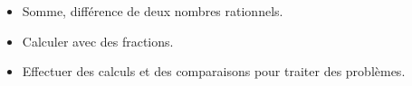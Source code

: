 \begin{prerequis}    
    \begin{itemize}
        \item[\emoji{red-heart}] Somme, différence de deux nombres rationnels.
        \item[\emoji{diamond-suit}] Calculer avec des fractions.
        \item[\emoji{diamond-suit}] Effectuer des calculs et des comparaisons pour traiter des problèmes.
    \end{itemize}
\end{prerequis}